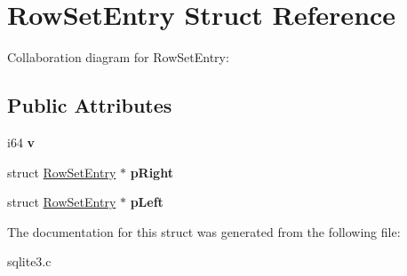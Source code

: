 \hypertarget{structRowSetEntry}{}\section{Row\+Set\+Entry Struct Reference}
\label{structRowSetEntry}


Collaboration diagram for Row\+Set\+Entry\+:
\subsection*{Public Attributes}
\begin{DoxyCompactItemize}
\item 
i64 {\bfseries v}\hypertarget{structRowSetEntry_ac72670935246f1bff5e4d96703574071}{}\label{structRowSetEntry_ac72670935246f1bff5e4d96703574071}

\item 
struct \hyperlink{structRowSetEntry}{Row\+Set\+Entry} $\ast$ {\bfseries p\+Right}\hypertarget{structRowSetEntry_ac39c09525dd24f42af522587d1bc5026}{}\label{structRowSetEntry_ac39c09525dd24f42af522587d1bc5026}

\item 
struct \hyperlink{structRowSetEntry}{Row\+Set\+Entry} $\ast$ {\bfseries p\+Left}\hypertarget{structRowSetEntry_a59365203c30ce782ae38e534c90db14b}{}\label{structRowSetEntry_a59365203c30ce782ae38e534c90db14b}

\end{DoxyCompactItemize}


The documentation for this struct was generated from the following file\+:\begin{DoxyCompactItemize}
\item 
sqlite3.\+c\end{DoxyCompactItemize}
